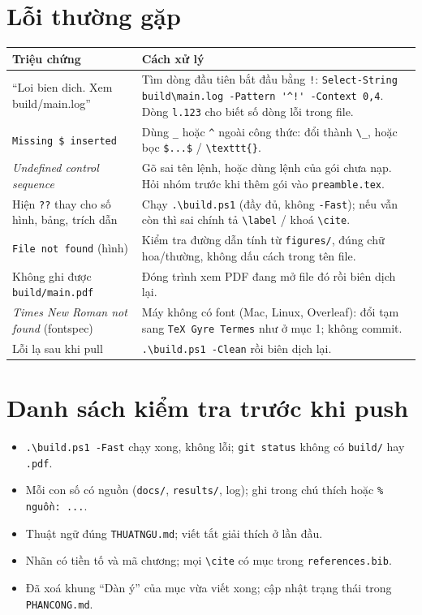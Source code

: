 \documentclass[11pt,a4paper]{article}
\newcommand{\file}[1]{\texttt{#1}}
\begin{document}
\section{Lỗi thường gặp}
\begin{tabular}{@{}>{\raggedright\arraybackslash}p{4.4cm}>{\raggedright\arraybackslash}p{11.9cm}@{}}
\toprule
\textbf{Triệu chứng} & \textbf{Cách xử lý} \\ \midrule
``Loi bien dich. Xem build/main.log'' & Tìm dòng đầu tiên bắt đầu bằng \verb+!+: \verb+Select-String build\main.log -Pattern '^!' -Context 0,4+. Dòng \verb+l.123+ cho biết số dòng lỗi trong file. \\
\verb+Missing $ inserted+ & Dùng \verb+_+ hoặc \verb+^+ ngoài công thức: đổi thành \verb+\_+, hoặc bọc \verb+$...$+ / \verb+\texttt{}+. \\
\emph{Undefined control sequence} & Gõ sai tên lệnh, hoặc dùng lệnh của gói chưa nạp. Hỏi nhóm trước khi thêm gói vào \file{preamble.tex}. \\
Hiện \verb+??+ thay cho số hình, bảng, trích dẫn & Chạy \verb+.\build.ps1+ (đầy đủ, không \verb+-Fast+); nếu vẫn còn thì sai chính tả \verb+\label+ / khoá \verb+\cite+. \\
\verb+File not found+ (hình) & Kiểm tra đường dẫn tính từ \file{figures/}, đúng chữ hoa/thường, không dấu cách trong tên file. \\
Không ghi được \verb+build/main.pdf+ & Đóng trình xem PDF đang mở file đó rồi biên dịch lại. \\
\emph{Times New Roman not found} (fontspec) & Máy không có font (Mac, Linux, Overleaf): đổi tạm sang \verb+TeX Gyre Termes+ như ở mục 1; không commit. \\
Lỗi lạ sau khi pull & \verb+.\build.ps1 -Clean+ rồi biên dịch lại. \\ \bottomrule
\end{tabular}

\section{Danh sách kiểm tra trước khi push}
\begin{itemize}
  \item[$\square$] \verb+.\build.ps1 -Fast+ chạy xong, không lỗi; \verb+git status+ không có \verb+build/+ hay \verb+.pdf+.
  \item[$\square$] Mỗi con số có nguồn (\verb+docs/+, \verb+results/+, log); ghi trong chú thích hoặc \verb+% nguồn: ...+.
  \item[$\square$] Thuật ngữ đúng \file{THUATNGU.md}; viết tắt giải thích ở lần đầu.
  \item[$\square$] Nhãn có tiền tố và mã chương; mọi \verb+\cite+ có mục trong \file{references.bib}.
  \item[$\square$] Đã xoá khung ``Dàn ý'' của mục vừa viết xong; cập nhật trạng thái trong \file{PHANCONG.md}.
\end{itemize}
\end{document}

